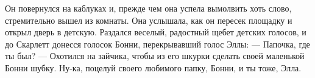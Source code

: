 Он повернулся на каблуках и, прежде чем она успела вымолвить хоть слово, стремительно вышел из комнаты. Она услышала, как он пересек площадку и открыл дверь в детскую. Раздался веселый, радостный щебет детских голосов, и до Скарлетт донесся голосок Бонни, перекрывавший голос Эллы:
— Папочка, где ты был?
— Охотился на зайчика, чтобы из его шкурки сделать своей маленькой Бонни шубку. Ну-ка, поцелуй своего любимого папку, Бонни, и ты тоже, Элла.

